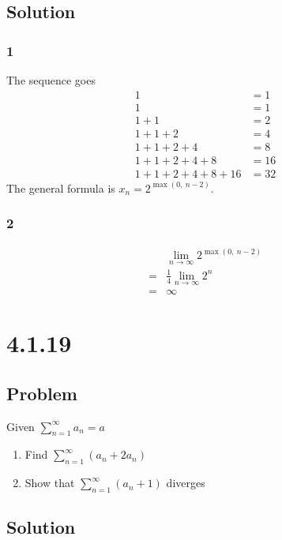 \documentclass[12pt]{article}
\begin{document}
\subsection*{Solution}

\subsubsection*{1}
The sequence goes
\begin{align*}
    1 &= 1             \\
    1 &= 1             \\
    1+1 &= 2           \\
    1+1+2 &= 4         \\
    1+1+2+4 &= 8       \\
    1+1+2+4+8 &= 16    \\
    1+1+2+4+8+16 &= 32
\end{align*}
The general formula is $x_n = 2^{\max(0,\ n-2)}$.

\subsubsection*{2}
\begin{align*}
     & \lim_{n\to\infty} 2^{\max(0,\ n-2)} \\
    =& \frac{1}{4} \lim_{n\to\infty} 2^n \\
    =& \infty
\end{align*}



\section*{4.1.19}

\subsection*{Problem}
Given $\sum_{n = 1}^\infty a_n = a$
\begin{enumerate}
    \item Find $\sum_{n = 1}^\infty (a_n + 2a_n)$
    \item Show that $\sum_{n = 1}^\infty (a_n + 1)$ diverges
\end{enumerate}

\subsection*{Solution}
\end{document}
